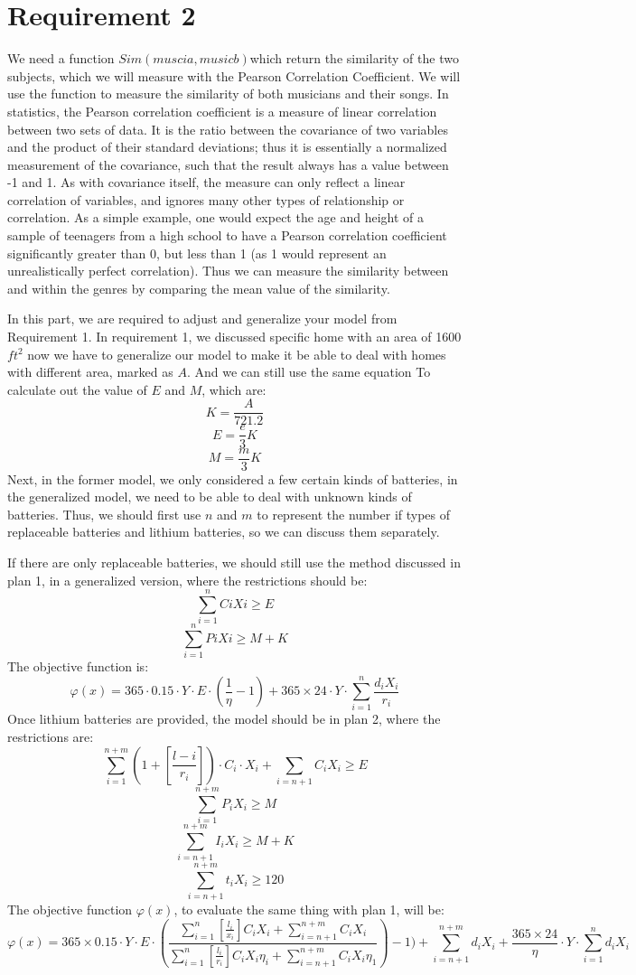 \documentclass{article}
\begin{document}
\section{Requirement 2}
We need a function $Sim(musci a, music b)$which return the similarity of the two subjects, which we will measure with the Pearson Correlation Coefficient.
We will use the function to
measure the similarity of both musicians and their songs. In statistics, the Pearson correlation coefficient  is a measure of linear correlation between
two sets of data. It is the ratio between the covariance of two variables and the product of their standard deviations; thus it is essentially a normalized
measurement of the covariance, such that the result always has a value between -1 and 1. As with covariance itself, the measure can only reflect a linear
correlation of variables, and ignores many other types of relationship or correlation. As a simple example, one would expect the age and height of
a sample of teenagers from a high school to have a Pearson correlation coefficient significantly greater than 0, but less than 1
(as 1 would represent an unrealistically perfect correlation).
Thus we can measure the similarity between and within the genres by comparing the mean value of the similarity.




In this part, we are required to adjust and generalize your model from Requirement 1.
In requirement 1, we discussed specific home with an area of 1600$ft^2$ now we have to generalize our  model to make it be able to deal with homes with different area, marked as $A$. And we can still use the same equation To
calculate out the value of $E$ and $M$, which are:$$K=\frac{A}{721.2}$$ $$E=\frac{e}{3}K$$  $$M=\frac{m}{3}K$$
Next, in the former model, we only considered a few certain kinds of batteries, in the generalized model, we need to be able to deal with unknown kinds of batteries. Thus, we should first use $n$ and $m$ to represent the
number if types of replaceable batteries and lithium batteries, so we can discuss them separately.\par
If there are only replaceable batteries, we should still use the method discussed in plan 1, in a generalized version, where the restrictions should be:
$$\sum_{i=1}^nCiXi\geq E$$
$$\sum_{i=1}^nPiXi\geq M+K$$
The objective function is:
$$\varphi (x)=365 \cdot 0.15 \cdot Y \cdot E \cdot (\frac{1}{\eta }-1) +365\times 24\cdot Y \cdot \sum_{i=1} ^n\frac{d_iX_i}{r_i}$$
Once lithium batteries are provided, the model should be in plan 2, where the restrictions are:
$$\sum_{i=1}^{n+m}(1+[\frac{l-i}{r_i}]) \cdot C_i \cdot X_i + \sum_{i=n+1}C_iX_i\geq E$$
$$\sum_{i=1}^{n+m}P_iX_i\geq M$$
$$\sum_{i=n+1}^{n+m}I_iX_i\geq M+K$$
$$\sum_{i=n+1}^{n+m} t_iX_i\geq 120$$
The objective function $\varphi (x)$, to evaluate the same thing with plan 1,  will be:
$$\varphi (x) = 365 \times 0.15 \cdot Y \cdot E \cdot (\frac{\sum^n_{i=1}[\frac{l_i}{x_i}]C_iX_i+\sum_{i=n+1}^{n+m}C_iX_i}{\sum^n_{i=1}[\frac{l_i}{r_i}]C_iX_i\eta _i+\sum_{i=n+1}^{n+m}C_iX_i\eta _1})-1)
    + \sum_{i=n+1} ^{n+m}d_iX_i+\frac{365 \times 24}{\eta } \cdot Y \cdot \sum_{i=1} ^{n}d_iX_i $$
\end{document}
